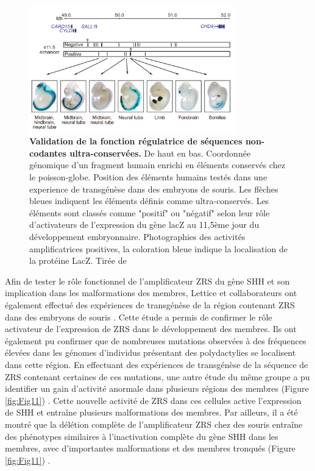 \begin{figure}[h]
    \centering
    \includegraphics[width=0.8\textwidth, page=1] {figures/introduction/fig10.png}
    \caption[Validation de la fonction régulatrice de séquences non-codantes ultra-conservées.]{
    \textbf{Validation de la fonction régulatrice de séquences non-codantes ultra-conservées.} De haut en bas. Coordonnée génomique d'un fragment humain enrichi en éléments conservés chez le poisson-globe. Position des éléments humains testés dans une experience de transgénèse dans des embryons de souris. Les flèches bleues indiquent les éléments définis comme ultra-conservés. Les éléments sont classés comme "positif" ou "négatif" selon leur rôle d'activateurs de l'expression du gène lacZ au 11,5ème jour du développement embryonnaire. Photographies des activités amplificatrices positives, la coloration bleue indique la localisation de la protéine LacZ. Tirée de \citep{pennacchio_vivo_2006}\\
    }
    \label{fig:Fig10}
\end{figure}

Afin de tester le rôle fonctionnel de l’\gls{amplificateur} \acrshort{ZRS} du gène \acrshort{SHH} et son implication dans les malformations des membres, Lettice et collaborateurs ont également effectué des expériences de transgénèse de la région contenant \acrshort{ZRS} dans des embryons de souris \citep{lettice_long-range_2003}. Cette étude a permis de confirmer le rôle activateur de l’expression de \acrshort{ZRS} dans le développement des membres. Ils ont également pu confirmer que de nombreuses mutations observées à des fréquences élevées dans les génomes d’individus présentant des polydactylies se localisent dans cette région. En effectuant des expériences de transgénèse de la séquence de \acrshort{ZRS} contenant certaines de ces mutations, une autre étude du même groupe a pu identifier un gain d’activité anormale dans plusieurs régions des membres (Figure \ref{fig:Fig11}) \citep{lettice_point_2008}. Cette nouvelle activité de \acrshort{ZRS} dans ces cellules active l’expression de \acrshort{SHH} et entraîne plusieurs malformations des membres. Par ailleurs, il a été montré que la délétion complète de l’\gls{amplificateur} \acrshort{ZRS} chez des souris entraîne des phénotypes similaires à l’inactivation complète du gène \acrshort{SHH} dans les membres, avec d’importantes malformations et des membres tronqués (Figure \ref{fig:Fig11}) \citep{sagai_elimination_2005}. 

